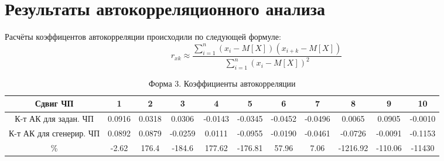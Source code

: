 \documentclass{article}
\begin{document}
\section{Результаты автокорреляционного анализа}

Расчёты коэффицентов автокорреляции происходили по следующей формуле:
\[r_{xk} \approx \frac{\sum_{i=1}^{n}(x_i - M[X])(x_{i+k} - M[X])}{\sum_{i=1}^{n}(x_i - M[X])^2}\]

\begin{table}[H]
    \centering
    \caption{Форма 3. Коэффициенты автокорреляции}
    \begin{tabular}{|c|c|c|c|c|c|c|c|c|c|c|}
        \hline
        Сдвиг ЧП & 1 & 2 & 3 & 4 & 5 & 6 & 7 & 8 & 9 & 10\\
        \hline
        К-т АК для задан. ЧП & 0.0916 & 0.0318 & 0.0306 & -0.0143 & -0.0345 & -0.0452 & -0.0496 & 0.0065 & 0.0905 & -0.0010\\
        \hline
        К-т АК для сгенерир. ЧП & 0.0892 & 0.0879 & -0.0259 & 0.0111 & -0.0955 & -0.0190 & -0.0461 & -0.0726 & -0.0091 & -0.1153\\
        \hline 
        \% & -2.62 & 176.4 & -184.6 & 177.62 & -176.81 & 57.96 & 7.06 & -1216.92 & -110.06 & -11430\\
        \hline
    \end{tabular}
\end{table}
\end{document}

